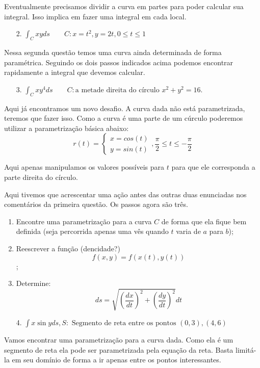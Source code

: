 Eventualmente precisamos dividir a curva em partes para poder calcular sua integral. Isso implica em fazer uma integral em cada local.

\begin{enumerate}
\item[2.] $\int_C xy ds \qquad C:x=t^2, y=2t, 0 \leq t \leq 1$
\end{enumerate}

Nessa segunda questão temos uma curva ainda determinada de forma paramétrica. Seguindo os dois passos indicados acima podemos encontrar rapidamente a integral que devemos calcular.

\begin{enumerate}
\item[3.] $\int_C xy^4 ds \qquad C:\mbox{a metade direita do círculo } x^2+y^2=16.$
\end{enumerate}

Aqui já encontramos um novo desafio. A curva dada não está parametrizada, teremos que fazer isso. Como a curva é uma parte de um cúrculo poderemos utilizar a parametrização básica abaixo: $$r(t)=\begin{cases} x=cos(t)\\ y=sin(t) \end{cases}, \frac{\pi}{2}\leq t \leq -\frac{\pi}{2}$$

Aqui apenas manipulamos os valores possíveis para $t$ para que ele corresponda a parte direita do círculo.

Aqui tivemos que acrescentar uma ação antes das outras duas enunciadas nos comentários da primeira questão. Os passos agora são três.

\begin{enumerate}
\item Encontre uma parametrização para a curva $C$ de forma que ela fique bem definida (seja percorrida apenas uma vês quando $t$ varia de $a$ para $b$);
\item Reescrever a função (dencidade?) $$f(x,y)=f(x(t),y(t))$$;
\item Determine: $$ds=\sqrt{\left(\dfrac{dx}{dt} \right)^2+\left(\dfrac{dy}{dt} \right)^2} dt$$
\end{enumerate}

\begin{enumerate}
\item[4.] $\int x\sin y ds, S:\mbox{ Segmento de reta entre os pontos }(0,3), (4,6) $
\end{enumerate}

Vamos encontrar uma parametrização para a curva dada. Como ela é um segmento de reta ela pode ser parametrizada pela equação da reta. Basta limitá-la em seu domínio de forma a ir apenas entre os pontos interessantes.

